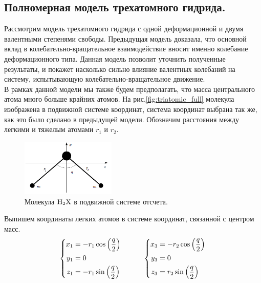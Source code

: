 \subsection{Полномерная модель трехатомного гидрида.}

Рассмотрим модель трехатомного гидрида с одной деформационной и двумя валентными степенями свободы. Предыдущая модель доказала, что основной вклад в колебательно-вращательное взаимодействие вносит именно колебание деформационного типа. Данная модель позволит уточнить полученные результаты, и покажет насколько сильно влияние валентных колебаний на систему, испытывающую колебательно-вращательное движение. \\
В рамках данной модели мы также будем предполагать, что масса центрального атома много больше крайних атомов. На рис.\eqref{fig:triatomic_full} молекула изображена в подвижной системе координат, система координат выбрана так же, как это было сделано в предыдущей модели. Обозначим расстояния между легкими и тяжелым атомами $r_1$ и $r_2$.

\begin{figure}[H]
  \centering
	\includegraphics[width=0.4\textwidth]{../pictures/triatomic_full.png}
	\caption{Молекула $\ce{H2X}$ в подвижной системе отсчета.}
	\label{fig:triatomic_full}
\end{figure}

Выпишем координаты легких атомов в системе координат, связанной с центром масс.
\vverh
\begin{gather}
\left\{
\begin{aligned}
x_1 &= - r_1 \cos \left( \frac{q}{2} \right) \\
y_1 &= 0 \\
z_1 &= - r_1 \sin \left( \frac{q}{2} \right) 
\end{aligned}
\right. \quad \quad \quad
\left\{
\begin{aligned}
x_3 &= - r_2 \cos \left( \frac{q}{2} \right) \\
y_3 &= 0 \\
z_3 &= r_2 \sin \left( \frac{q}{2} \right)
\end{aligned}
\right.\notag
\end{gather}

